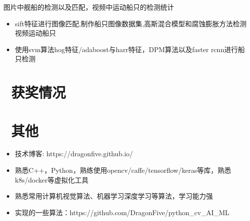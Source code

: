 \documentclass{resume}
\begin{document}
图片中舰船的检测以及匹配，视频中运动船只的检测统计
\begin{itemize}
  \item sift特征进行图像匹配,制作船只图像数据集,高斯混合模型和腐蚀膨胀方法检测视频运动船只
  \item 使用svm算法hog特征/adaboost与harr特征，DPM算法以及faster rcnn进行船只检测
\end{itemize}




\section{\faHeartO\ 获奖情况}

\section{\faInfo\ 其他}
\begin{itemize}[parsep=0.5ex]
  \item 技术博客: https://dragonfive.github.io/
  \item 熟悉C++，Python，熟练使用opencv/caffe/tensorflow/keras等库，熟悉k8s/docker等虚拟化工具
  \item 熟悉常用计算机视觉算法、机器学习深度学习等算法，学习能力强
  \item 实现的一些算法：https://github.com/DragonFive/python\_cv\_AI\_ML
\end{itemize}

%
%
\end{document}
